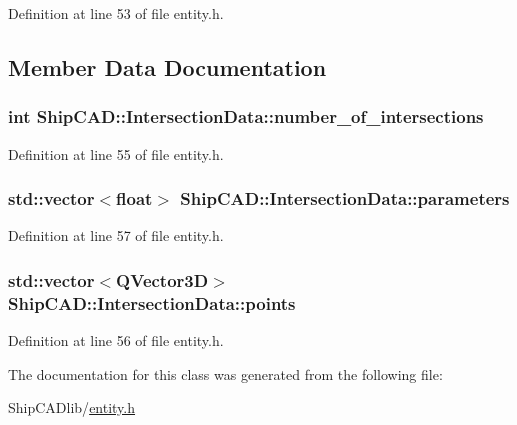 Definition at line 53 of file entity.\-h.



\subsection{Member Data Documentation}
\hypertarget{classShipCAD_1_1IntersectionData_ab6b41dcefd115d57e47864b4ed028bc8}{
\subsubsection[{number\-\_\-of\-\_\-intersections}]{\setlength{\rightskip}{0pt plus 5cm}int Ship\-C\-A\-D\-::\-Intersection\-Data\-::number\-\_\-of\-\_\-intersections}}\label{classShipCAD_1_1IntersectionData_ab6b41dcefd115d57e47864b4ed028bc8}


Definition at line 55 of file entity.\-h.

\hypertarget{classShipCAD_1_1IntersectionData_a06fcbb71243644bdea0e5b86da3b191c}{
\subsubsection[{parameters}]{\setlength{\rightskip}{0pt plus 5cm}std\-::vector$<$float$>$ Ship\-C\-A\-D\-::\-Intersection\-Data\-::parameters}}\label{classShipCAD_1_1IntersectionData_a06fcbb71243644bdea0e5b86da3b191c}


Definition at line 57 of file entity.\-h.

\hypertarget{classShipCAD_1_1IntersectionData_a926e126e42d95e01b39e2750a0e1fb95}{
\subsubsection[{points}]{\setlength{\rightskip}{0pt plus 5cm}std\-::vector$<$Q\-Vector3\-D$>$ Ship\-C\-A\-D\-::\-Intersection\-Data\-::points}}\label{classShipCAD_1_1IntersectionData_a926e126e42d95e01b39e2750a0e1fb95}


Definition at line 56 of file entity.\-h.



The documentation for this class was generated from the following file\-:\begin{DoxyCompactItemize}
\item 
Ship\-C\-A\-Dlib/\hyperlink{entity_8h}{entity.\-h}\end{DoxyCompactItemize}
